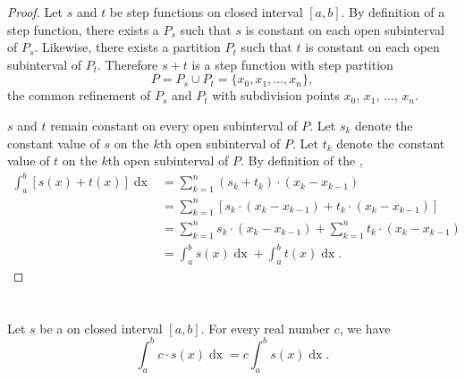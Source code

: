 \documentclass{report}
\begin{document}
\begin{proof}

  Let $s$ and $t$ be step functions on closed interval $[a, b]$.
  By definition of a step function, there exists a 
    $P_s$ such that $s$ is constant on each open subinterval of $P_s$.
  Likewise, there exists a partition $P_t$ such that $t$ is constant on each
    open subinterval of $P_t$.
  Therefore $s + t$ is a step function with step partition
    $$P = P_s \cup P_t = \{x_0, x_1, \ldots, x_n\},$$ the common refinement of
    $P_s$ and $P_t$ with subdivision points $x_0$, $x_1$, $\ldots$, $x_n$.

  $s$ and $t$ remain constant on every open subinterval of $P$.
  Let $s_k$ denote the constant value of $s$ on the $k$th open subinterval of
    $P$.
  Let $t_k$ denote the constant value of $t$ on the $k$th open subinterval of
    $P$.
  By definition of the ,
    \begin{align*}
      \int_a^b \left[ s(x) + t(x) \right] \mathop{dx}
        & = \sum_{k=1}^n (s_k + t_k) \cdot (x_k - x_{k-1}) \\
        & = \sum_{k=1}^n \left[ s_k \cdot (x_k - x_{k-1}) +
                                t_k \cdot (x_k - x_{k-1}) \right] \\
        & = \sum_{k=1}^n s_k \cdot (x_k - x_{k-1}) +
            \sum_{k=1}^n t_k \cdot (x_k - x_{k-1}) \\
        & = \int_a^b s(x) \mathop{dx} + \int_a^b t(x) \mathop{dx}.
    \end{align*}

\end{proof}

\section{}%
\label{sec:step-homogeneous-property}
\label{sec:theorem-1.3}

\begin{theorem}{1.3}

  Let $s$ be a  on closed interval $[a, b]$.
  For every real number $c$, we have
    $$\int_a^b c \cdot s(x) \mathop{dx} = c\int_a^b s(x) \mathop{dx}.$$

\end{theorem}
\end{document}
